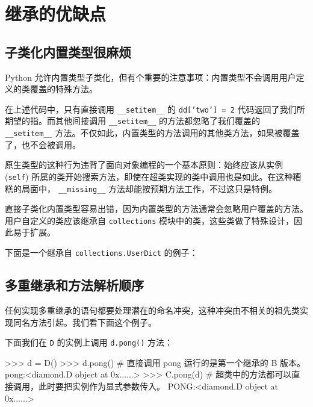 \section{继承的优缺点}
\subsection{子类化内置类型很麻烦}

Python 允许内置类型子类化，但有个重要的注意事项：内置类型不会调用用户定义的类覆盖的特殊方法。



在上述代码中，只有直接调用 \texttt{\_\_setitem\_\_} 的 \texttt{dd['two'] = 2} 代码返回了我们所期望的指。而其他间接调用 \texttt{\_\_setitem\_\_} 的方法都忽略了我们覆盖的 \texttt{\_\_setitem\_\_} 方法。不仅如此，内置类型的方法调用的其他类方法，如果被覆盖了，也不会被调用。

原生类型的这种行为违背了面向对象编程的一个基本原则：始终应该从实例 (\texttt{self}) 所属的类开始搜索方法，即使在超类实现的类中调用也是如此。在这种糟糕的局面中， \texttt{\_\_missing\_\_} 方法却能按预期方法工作，不过这只是特例。

直接子类化内置类型容易出错，因为内置类型的方法通常会忽略用户覆盖的方法。用户自定义的类应该继承自 \texttt{collections} 模块中的类，这些类做了特殊设计，因此易于扩展。

下面是一个继承自 \texttt{collections.UserDict} 的例子：



\subsection{多重继承和方法解析顺序}

任何实现多重继承的语句都要处理潜在的命名冲突，这种冲突由不相关的祖先类实现同名方法引起。我们看下面这个例子。



下面我们在 \texttt{D} 的实例上调用 \texttt{d.pong()} 方法：

\begin{python}
>>> d = D()
>>> d.pong()    # 直接调用 pong 运行的是第一个继承的 B 版本。
pong:<diamond.D object at 0x......>
>>> C.pong(d)   # 超类中的方法都可以直接调用，此时要把实例作为显式参数传入。
PONG:<diamond.D object at 0x......>
\end{python}

